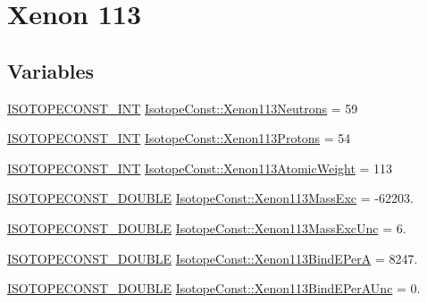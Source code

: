 \hypertarget{group___isotope_const-_xenon-_xe113}{}\section{Xenon 113}
\label{group___isotope_const-_xenon-_xe113}
\subsection*{Variables}
\begin{DoxyCompactItemize}
\item 
\mbox{\hyperlink{group___isotope_const-_macros_ga5f18360b3e99483a35c32d789e62621c}{I\+S\+O\+T\+O\+P\+E\+C\+O\+N\+S\+T\+\_\+\+I\+NT}} \mbox{\hyperlink{group___isotope_const-_xenon-_xe113_ga29b52535208e5bd92edb7c64ca434b8d}{Isotope\+Const\+::\+Xenon113\+Neutrons}} = 59
\item 
\mbox{\hyperlink{group___isotope_const-_macros_ga5f18360b3e99483a35c32d789e62621c}{I\+S\+O\+T\+O\+P\+E\+C\+O\+N\+S\+T\+\_\+\+I\+NT}} \mbox{\hyperlink{group___isotope_const-_xenon-_xe113_ga8d0ee246b500a1ae6b830917ccd69fda}{Isotope\+Const\+::\+Xenon113\+Protons}} = 54
\item 
\mbox{\hyperlink{group___isotope_const-_macros_ga5f18360b3e99483a35c32d789e62621c}{I\+S\+O\+T\+O\+P\+E\+C\+O\+N\+S\+T\+\_\+\+I\+NT}} \mbox{\hyperlink{group___isotope_const-_xenon-_xe113_gacc9de7c62ce783f7d5957fcdd9b354b3}{Isotope\+Const\+::\+Xenon113\+Atomic\+Weight}} = 113
\item 
\mbox{\hyperlink{group___isotope_const-_macros_ga8f45a7272ce02c0b4c65c44636ed719a}{I\+S\+O\+T\+O\+P\+E\+C\+O\+N\+S\+T\+\_\+\+D\+O\+U\+B\+LE}} \mbox{\hyperlink{group___isotope_const-_xenon-_xe113_gac145760cc67d3347762f3078570e26c1}{Isotope\+Const\+::\+Xenon113\+Mass\+Exc}} = -\/62203.
\item 
\mbox{\hyperlink{group___isotope_const-_macros_ga8f45a7272ce02c0b4c65c44636ed719a}{I\+S\+O\+T\+O\+P\+E\+C\+O\+N\+S\+T\+\_\+\+D\+O\+U\+B\+LE}} \mbox{\hyperlink{group___isotope_const-_xenon-_xe113_ga44574d17d6bc437d868b6c594e7ce44c}{Isotope\+Const\+::\+Xenon113\+Mass\+Exc\+Unc}} = 6.
\item 
\mbox{\hyperlink{group___isotope_const-_macros_ga8f45a7272ce02c0b4c65c44636ed719a}{I\+S\+O\+T\+O\+P\+E\+C\+O\+N\+S\+T\+\_\+\+D\+O\+U\+B\+LE}} \mbox{\hyperlink{group___isotope_const-_xenon-_xe113_ga8af36eba683d316bc5debbd098a70428}{Isotope\+Const\+::\+Xenon113\+Bind\+E\+PerA}} = 8247.
\item 
\mbox{\hyperlink{group___isotope_const-_macros_ga8f45a7272ce02c0b4c65c44636ed719a}{I\+S\+O\+T\+O\+P\+E\+C\+O\+N\+S\+T\+\_\+\+D\+O\+U\+B\+LE}} \mbox{\hyperlink{group___isotope_const-_xenon-_xe113_gae1693ad288a925e8fc364d08fc0cfe46}{Isotope\+Const\+::\+Xenon113\+Bind\+E\+Per\+A\+Unc}} = 0.

\end{DoxyCompactItemize}
